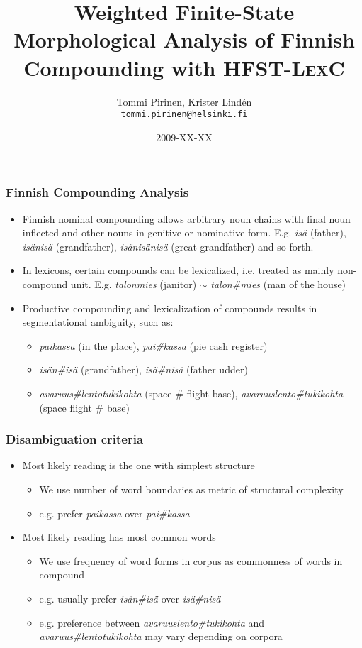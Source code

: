 \documentclass[xetex]{beamer}
\begin{document}
\title[Weighted Finnish Compounds with HFST-LexC]{Weighted Finite-State Morphological Analysis of Finnish Compounding with
\textsc{HFST-LexC}}
\author[Tommi Pirinen]{Tommi Pirinen, Krister Lindén\\ \texttt{tommi.pirinen@helsinki.fi}}
\date{2009-XX-XX}


\begin{frame}
\titlepage
\end{frame}

\begin{frame}
\frametitle{Finnish Compounding Analysis}
\begin{itemize}
\item Finnish nominal compounding allows arbitrary noun chains with final noun
inflected and other nouns in genitive or nominative form.
E.g. \emph{isä} (father), \emph{isänisä} (grandfather), \emph{isänisänisä}
(great grandfather) and so forth.
\item In lexicons, certain compounds can be lexicalized, i.e. treated as mainly non-compound unit. E.g. \emph{talonmies} (janitor) $\sim$
\emph{talon\#mies} (man of the house)
\item Productive compounding and lexicalization of compounds results in segmentational ambiguity, such as:
\begin{itemize}
\item \emph{paikassa} (in the place), \emph{pai\#kassa} (pie cash register)
\item \emph{isän\#isä} (grandfather), \emph{isä\#nisä} (father udder)
\item \emph{avaruus\#lentotukikohta} (space \# flight base), \emph{avaruuslento\#tukikohta} (space flight \# base)
\end{itemize}
\end{itemize}
\end{frame}

\begin{frame}
\frametitle{Disambiguation criteria}
\begin{itemize}
\item Most likely reading is the one with simplest structure
\begin{itemize}
\item We use number of word boundaries as metric of structural complexity
\item e.g. prefer \emph{paikassa} over \emph{pai\#kassa}
\end{itemize}
\item Most likely reading has most common words
\begin{itemize}
\item We use frequency of word forms in corpus as commonness of words in compound
\item e.g. usually prefer \emph{isän\#isä} over \emph{isä\#nisä}
\item e.g. preference between \emph{avaruuslento\#tukikohta} and 
\emph{avaruus\#lentotukikohta} may vary depending on corpora
\end{itemize}
\end{itemize}
\end{frame}
\end{document}

